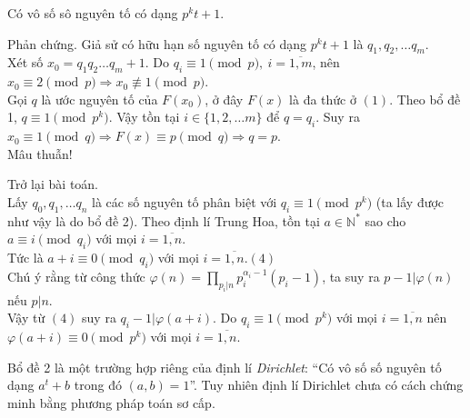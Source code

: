 \begin{bt}
{\begin{bode}
Có vô số sô nguyên tố có dạng $p^kt+1$.
\begin{cm}
Phản chứng. Giả sử có hữu hạn số nguyên tố có dạng $p^kt+1$ là $q_1,q_2,\dots q_m$.\\
Xét số $x_0=q_1q_2\dots q_m+1$. Do $q_i\equiv 1\pmod p,\ i=\overline{1,m}$, nên $x_0\equiv 2\pmod p\Rightarrow x_0\not\equiv 1\pmod p$.\\
Gọi $q$ là ước nguyên tố của $F(x_0)$, ở đây $F(x)$ là đa thức ở $(1)$. Theo bổ đề 1, $q\equiv 1\pmod {p^k}$. Vậy tồn tại $i\in\{1,2,\dots m\}$ để $q=q_i$. Suy ra $x_0\equiv 1\pmod q\Rightarrow F(x)\equiv p\pmod q\Rightarrow q=p$.\\
Mâu thuẫn!
\end{cm}
\end{bode}
Trở lại bài toán.\\
Lấy $q_0,q_1,\dots q_n$ là các số nguyên tố phân biệt với $q_i\equiv 1\pmod {p^k}$ (ta lấy được như vậy là do bổ đề 2). Theo định lí Trung Hoa, tồn tại $a\in\mathbb{N}^*$ sao cho $a\equiv i\pmod{q_i}$ với mọi $i=\overline{1,n}$.\\
Tức là $a+i\equiv 0\pmod {q_i}$ với mọi $i=\overline{1,n}$.\hfill $(4)$\\
Chú ý rằng từ công thức $\varphi(n)=\displaystyle\prod_{p_i|n}p_i^{\alpha_i-1}(p_i-1)$, ta suy ra $p-1|\varphi(n)$ nếu $p|n$.\\
Vậy từ $(4)$ suy ra $q_i-1|\varphi(a+i)$. Do $q_i\equiv 1\pmod{p^k}$ với mọi $i=\overline{1,n}$ nên $\varphi(a+i)\equiv 0\pmod{p^k}$ với mọi $i=\overline{1,n}$.
\begin{nx}
Bổ đề 2 là một trường hợp riêng của định lí \textit{Dirichlet}: ``Có vô số số nguyên tố dạng $a^t+b$ trong đó $(a,b)=1$''. Tuy nhiên định lí Dirichlet chưa có cách chứng minh bằng phương pháp toán sơ cấp.
\end{nx}
}
\end{bt}


